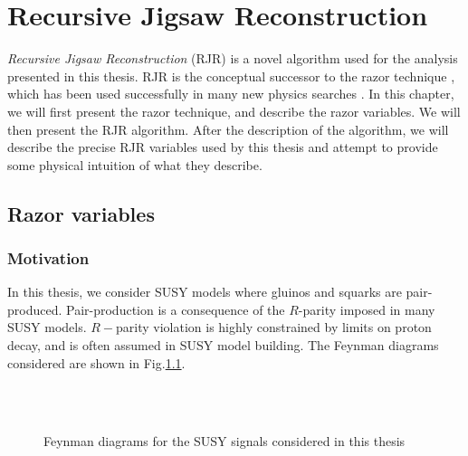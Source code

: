 

\chapter[][Recursive Jigsaw Reconstruction]{Recursive Jigsaw Reconstruction}

\textit{Recursive Jigsaw Reconstruction} (RJR) \cite{Jackson:2016mfb,ATLAS-CONF-2016-078} is a novel algorithm used for the analysis presented in this thesis.
RJR is the conceptual successor to the razor technique \cite{Rogan:2010kb,Buckley:2013kua}, which has been used successfully in many new physics searches \cite{SUSY-2014-05,SUSY-2014-06,CMS-SUS-13-004,CMS-SUS-12-005,CMS-SUS-11-024,SUSY-2011-22}.
In this chapter, we will first present the razor technique, and describe the razor variables.
We will then present the RJR algorithm.
After the description of the algorithm, we will describe the precise RJR variables used by this thesis and attempt to provide some physical intuition of what they describe.

\section{Razor variables}

\subsection{Motivation}
In this thesis, we consider SUSY models where gluinos and squarks are pair-produced.
Pair-production is a consequence of the $R$-parity imposed in many SUSY models.
$R-$parity violation is highly constrained by limits on proton decay\cite{susyPrimer}, and is often assumed in SUSY model building.
The Feynman diagrams considered are shown in Fig.\ref{fig:feynman_signal}.
\begin{figure}
\caption{Feynman diagrams for the SUSY signals considered in this thesis} \label{fig:feynman_signal}
 \\
 \\
\end{figure}

